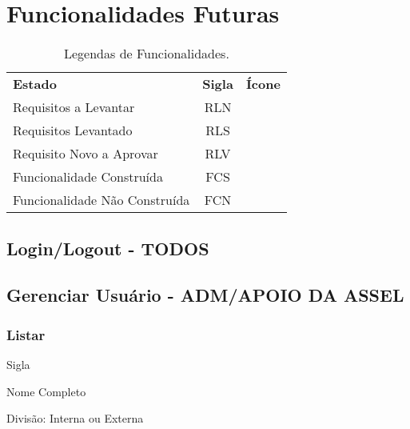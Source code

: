 \chapter{Funcionalidades Futuras}

\begin{table}[!h]
	\begin{center}
		\begin{tabular}{|p{}|c|c|}
			\hline
			\rowcolor{corCOULD!50} \multicolumn{3}{|c|}{\Large Legenda \normalsize} \\ \hline \hline
			\rowcolor{lightgray}\textbf{Estado} & \textbf{Sigla} & \textbf{Ícone} \\ \hline
			\rowcolor{corCOULD!10} Requisitos a Levantar & RLN  & \msrln \\ \hline
			\rowcolor{corCOULD!20} Requisitos Levantado & RLS & \msrls \\ \hline
			\rowcolor{corCOULD!10} Requisito Novo a Aprovar & RLV & \msrlv \\ \hline
			\rowcolor{corCOULD!20} Funcionalidade Construída & FCS & \msfcs \\ \hline
			\rowcolor{corCOULD!10} Funcionalidade Não Construída & FCN & \msfcn \\ \hline
		\end{tabular}    
		\caption{\label{tab:legenda:funcionalidades} Legendas de Funcionalidades.}
	\end{center}
\end{table}



\section{Login/Logout \msfcn - TODOS}

\section{Gerenciar Usuário \msrls - ADM/APOIO DA ASSEL}

	\subsection{Listar}
	
	Sigla
	
	Nome Completo
	
	Divisão: Interna ou Externa
	
